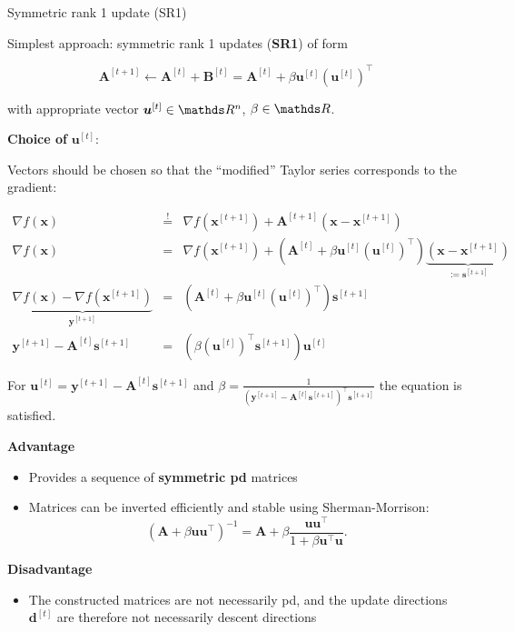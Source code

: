 \documentclass[11pt,compress,t,notes=noshow, xcolor=table]{beamer}
\begin{document}
\begin{vbframe}{Symmetric rank 1 update (SR1)}

Simplest approach: symmetric rank 1 updates (\textbf{SR1}) of form

$$
\bm{A}^{[t+1]} \leftarrow \bm{A}^{[t]} + \bm{B}^{[t]} = \bm{A}^{[t]} + \beta \bm{u}^{[t]}(\bm{u}^{[t]})^{\top}
$$

with appropriate vector $\bm{u}^{[t]} \in \R^n$, $\beta \in \R$.


\framebreak

\textbf{Choice of} $\bm{u}^{[t]}$:

Vectors should be chosen so that the \enquote{modified} Taylor series corresponds to the gradient:

\begin{eqnarray*}
\nabla f(\mathbf{x}) &\overset{!}{=}& \nabla f(\mathbf{x}^{[t+1]}) +
\bm{A}^{[t+1]}(\mathbf{x} - \mathbf{x}^{[t+1]}) \\
\nabla f(\mathbf{x}) &=& \nabla f(\mathbf{x}^{[t+1]}) +  \left(\bm{A}^{[t]} +
\beta \bm{u}^{[t]}(\bm{u}^{[t]})^\top\right)\underbrace{(\mathbf{x} - \mathbf{x}^{[t+1]})}_{:= \bm{s}^{[t+1]}} \\
\underbrace{\nabla f(\mathbf{x}) - \nabla f(\mathbf{x}^{[t+1]})}_{\bm{y}^{[t+1]}} &=& \left(\bm{A}^{[t]} + \beta \bm{u}^{[t]} (\bm{u}^{[t]})^{\top}\right) \bm{s}^{[t+1]} \\
\bm{y}^{[t+1]} - \bm{A}^{[t]} \bm{s}^{[t+1]} &=& \left(\beta (\bm{u}^{[t]})^{\top} \bm{s}^{[t+1]}\right) \bm{u}^{[t]}
\end{eqnarray*}

For $\bm{u}^{[t]} = \bm{y}^{[t+1]} - \bm{A}^{[t]} \bm{s}^{[t+1]}$ and $\beta = \frac{1}{\left(\bm{y}^{[t+1]} - \bm{A}^{[t]}\bm{s}^{[t+1]}\right)^\top\bm{s}^{[t+1]}}$ the equation is satisfied.

\framebreak

\textbf{Advantage}
\begin{itemize}
\item Provides a sequence of \textbf{symmetric pd} matrices
\item Matrices can be inverted efficiently and stable using Sherman-Morrison:
$$
(\bm{A} + \beta \bm{u}\bm{u}^{\top})^{-1} = \bm{A} + \beta \frac{\bm{u}\bm{u}^{\top}}{1 + \beta\bm{u}^\top\bm{u}}.
$$
\end{itemize}

\textbf{Disadvantage}
\begin{itemize}
\item The constructed matrices are not necessarily pd, and the update directions $\bm{d}^{[t]}$ are therefore not necessarily descent directions
\end{itemize}

\end{vbframe}
\end{document}
